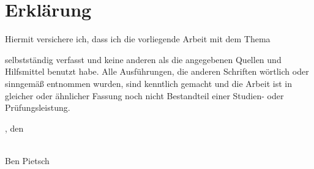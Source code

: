 \chapter{Erklärung}\label{ch:erklaerung}

Hiermit versichere ich, dass ich die vorliegende Arbeit mit dem Thema
\begin{quote}
    \textit{\titleDocument}
\end{quote}
selbstständig verfasst und keine anderen als die angegebenen Quellen und Hilfsmittel benutzt habe.
Alle Ausführungen, die anderen Schriften wörtlich oder sinngemäß entnommen wurden, sind kenntlich gemacht und die Arbeit ist in gleicher oder ähnlicher Fassung noch nicht Bestandteil einer Studien- oder Prüfungsleistung.


\begingroup
\setlength{\parindent}{0pt} %

\locationDocument, den \dateDocument
\bigskip
\bigskip

\newlength{\widthbox}
\settowidth{\widthbox}{\locationDocument, den \dateDocument}

\makebox[\widthbox]{\hrulefill}\\
Ben Pietsch
\endgroup

